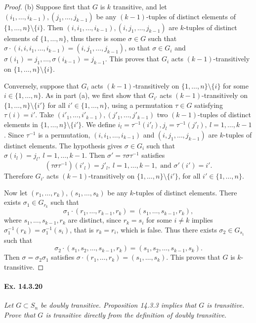 \documentclass[11pt,a4paper]{article}
\begin{document}
\begin{proof}
\item[(b)] Suppose first that $G$ is $k$ transitive, and let $(i_1,\ldots,i_{k-1}), (j_1,\ldots,j_{k-1})$ be any ${(k-1)}$-tuples of distinct elements of $\{1,\ldots,n\}\setminus \{i\}$. Then $(i, i_1,\ldots,i_{k-1}), (i, j_1,\ldots,j_{k-1})$ are $k$-tuples of distinct elements of $\{1,\ldots,n\}$, thus there is some $\sigma \in G$ such that $\sigma\cdot(i,i, i_1,\ldots,i_{k-1}) = (i, j_1,\ldots,j_{k-1})$, so that $\sigma \in G_i$ and $\sigma(i_1) = j_1,\ldots,\sigma(i_{k-1}) = j_{k-1}$. This proves that $G_i$ acts $(k-1)$-transitively on $\{1,\ldots,n\} \setminus \{i\}$.

Conversely, suppose that $G_i$ acts $(k-1)$-transitively on $\{1,\ldots,n\} \setminus \{i\}$ for some $i \in \{1,\ldots,n\}$. As in part (a), we first show that $G_{i'}$ acts $(k-1)$-transitively on $\{1,\ldots,n\} \setminus \{i'\}$ for all $i' \in \{1,\ldots,n\}$, using a permutation $\tau \in G$ satisfying $\tau(i) = i'$. Take $(i'_1,\ldots,i'_{k-1}), (j'_1,\ldots,j'_{k-1})$ two $(k-1)$-tuples of distinct elements in $\{1,\ldots,n\} \setminus \{i'\}$. We define $i_l= \tau^{-1}(i'_l), j_l = \tau^{-1}(j'_l),\ l=1,\ldots,k-1$. Since $\tau^{-1}$ is a permutation, $(i,i_1,\ldots,i_{k-1})$ and $(i,j_1,\ldots,j_{k-1})$ are $k$-tuples of distinct elements. The hypothesis gives $\sigma \in G_i$ such that $\sigma(i_l) = j_l,\ l=1,\ldots,k-1$. Then $\sigma'= \tau \sigma \tau^{-1}$ satisfies
$$(\tau \sigma \tau^{-1})(i'_l) = j'_l,\ l=1,\ldots,k-1,\text { and } \sigma'(i') = i'.$$
Therefore $G_{i'}$ acts $(k-1)$-transitively on $\{1,\ldots,n\} \setminus \{i'\}$, for all $i' \in \{1,\ldots,n\}$.

Now let $(r_1,\ldots,r_k), (s_1,\ldots,s_k)$ be any $k$-tuples of distinct elements. There exists $\sigma_1 \in G_{r_k}$ such that
$$\sigma_1\cdot (r_1,\ldots,r_{k-1},r_k) = (s_1,\ldots,s_{k-1},r_k),$$
where $s_1,\ldots,s_{k-1},r_k$ are distinct, since $r_k =s_i$ for some $i\ne k$ implies $\sigma_1^{-1}(r_k) = \sigma_1^{-1}(s_i)$, that is $r_k = r_i$, which is false. Thus there exists $\sigma_2  \in G_{s_1}$ such that
$$\sigma_2\cdot (s_1,s_2,\ldots,s_{k-1}, r_k) = (s_1,s_2,\ldots,s_{k-1},s_k).$$
Then $\sigma = \sigma_2\sigma_1$ satisfies $\sigma \cdot (r_1,\ldots,r_k) = (s_1,\ldots,s_k)$. This proves that $G$ is $k$-transitive.
 \end{proof}
 
  \paragraph{Ex. 14.3.20}{\it Let $G \subset S_n$ be doubly transitive. Proposition 14.3.3 implies that $G$ is transitive. Prove that $G$ is transitive directly from the definition of doubly transitive.
  }
  
\end{document}
